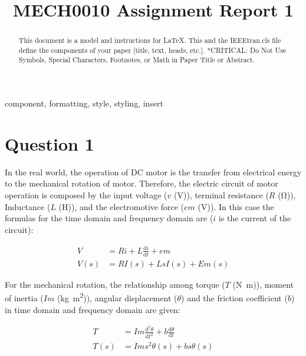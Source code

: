 \documentclass[conference]{IEEEtran}
\begin{document}
\title{MECH0010 Assignment Report 1
}

\author{
\and
{}
\and
{}
}

\maketitle

\begin{abstract}
This document is a model and instructions for \LaTeX.
This and the IEEEtran.cls file define the components of your paper [title, text, heads, etc.]. *CRITICAL: Do Not Use Symbols, Special Characters, Footnotes, 
or Math in Paper Title or Abstract.
\end{abstract}

\begin{IEEEkeywords}
component, formatting, style, styling, insert
\end{IEEEkeywords}

\section{Question 1}
In the real world, the operation of DC motor is the transfer from electrical energy to the mechanical rotation of motor. Therefore, the electric circuit of motor operation is composed by the input voltage ($v$ (\si{\volt})), terminal resistance ($R$ (\si{\ohm})), Inductance ($L$ (\si{\henry})), and the electromotive force ($em$ (\si{\volt})). In this case the formulas for the time domain and frequency domain are ($i$ is the current of the circuit):

\begin{align}
    V &= Ri + L \frac{\textrm{d}i}{\textrm{d} t} + em\\
    V(s) &= RI(s) + LsI(s) + Em(s) \label{ll1}
\end{align}

For the mechanical rotation, the relationship among torque ($T$ (\si{\newton\metre})), moment of inertia ($Im$ (\si{\kg\metre\squared})), angular displacement ($\theta$) and the friction coefficient ($b$) in time domain and frequency domain are given:

\begin{align}
    T &= Im \frac{\textrm{d}^2 \theta}{\textrm{d} t^2} + b \frac{\textrm{d} \theta}{\textrm{d} t}\\
    T(s) &= Ims^2 \theta(s) + bs\theta(s)\label{ll2}
\end{align}
\end{document}

